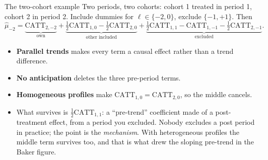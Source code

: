 \documentclass[
  11pt,
  ignorenonframetext,
  aspectratio=169,
]{beamer}
\providecommand{\tightlist}{%
  \setlength{\itemsep}{0pt}\setlength{\parskip}{0pt}}
\begin{document}
\begin{frame}{The two-cohort example}
\protect{}\label{the-two-cohort-example}
Two periods, two cohorts: cohort 1 treated in period 1, cohort 2 in
period 2. Include dummies for \(\ell \in \{-2, 0\}\), exclude
\(\{-1, +1\}\). Then \[
\hat\mu_{-2} = \underbrace{\text{CATT}_{2,-2}}_{\text{own}} + \underbrace{\tfrac12\text{CATT}_{1,0} - \tfrac12\text{CATT}_{2,0}}_{\text{other included}} + \underbrace{\tfrac12\text{CATT}_{1,1} - \text{CATT}_{1,-1} - \tfrac12\text{CATT}_{2,-1}}_{\text{excluded}}.
\]

\begin{itemize}
\tightlist
\item
  \textbf{Parallel trends} makes every term a causal effect rather than
  a trend difference.
\item
  \textbf{No anticipation} deletes the three pre-period terms.
\item
  \textbf{Homogeneous profiles} make
  \(\text{CATT}_{1,0} = \text{CATT}_{2,0}\), so the middle cancels.
\item
  What survives is \(\tfrac12\text{CATT}_{1,1}\): a ``pre-trend''
  coefficient made of a post-treatment effect, from a period you
  excluded. Nobody excludes a post period in practice; the point is the
  \emph{mechanism}. With heterogeneous profiles the middle term survives
  too, and that is what drew the sloping pre-trend in the Baker figure.
\end{itemize}
\end{frame}
\end{document}
